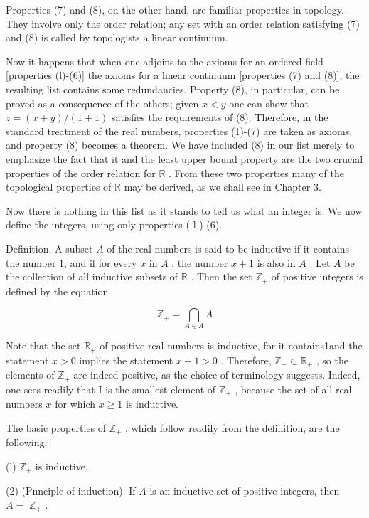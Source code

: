 \documentclass[10pt]{article}
\begin{document}
Properties (7) and (8), on the other hand, are familiar properties in topology. They involve only the order relation; any set with an order relation satisfying (7) and (8) is called by topologists a linear continuum.

Now it happens that when one adjoins to the axioms for an ordered field [properties (l)-(6)] the axioms for a linear continuum [properties (7) and (8)], the resulting list contains some redundancies. Property (8), in particular, can be proved as a consequence of the others; given \(x < y\) one can show that \(z = \left( {x + y}\right) /\left( {1 + 1}\right)\) satisfies the requirements of (8). Therefore, in the standard treatment of the real numbers, properties (1)-(7) are taken as axioms, and property (8) becomes a theorem. We have included (8) in our list merely to emphasize the fact that it and the least upper bound property are the two crucial properties of the order relation for \(\mathbb{R}\) . From these two properties many of the topological properties of \(\mathbb{R}\) may be derived, as we shall see in Chapter 3.

Now there is nothing in this list as it stands to tell us what an integer is. We now define the integers, using only properties ( l )-(6).

Definition. A subset \(A\) of the real numbers is said to be inductive if it contains the number 1, and if for every \(x\) in \(A\) , the number \(x + 1\) is also in \(A\) . Let \(A\) be the collection of all inductive subsets of \(\mathbb{R}\) . Then the set \({\mathbb{Z}}_{ + }\) of positive integers is defined by the equation

\[
{\mathbb{Z}}_{ + } = \mathop{\bigcap }\limits_{{A \in  A}}A
\]

Note that the set \({\mathbb{R}}_{ + }\) of positive real numbers is inductive, for it contains1and the statement \(x > 0\) implies the statement \(x + 1 > 0\) . Therefore, \({\mathbb{Z}}_{ + } \subset  {\mathbb{R}}_{ + }\) , so the elements of \({\mathbb{Z}}_{ + }\) are indeed positive, as the choice of terminology suggests. Indeed, one sees readily that I is the smallest element of \({\mathbb{Z}}_{ + }\) , because the set of all real numbers \(x\) for which \(x \geq  1\) is inductive.

The basic properties of \({\mathbb{Z}}_{ + }\) , which follow readily from the definition, are the following:

(l) \({\mathbb{Z}}_{ + }\) is inductive.

(2) (Pnnciple of induction). If \(A\) is an inductive set of positive integers, then \(A = \; {\mathbb{Z}}_{ + }\) .
\end{document}
